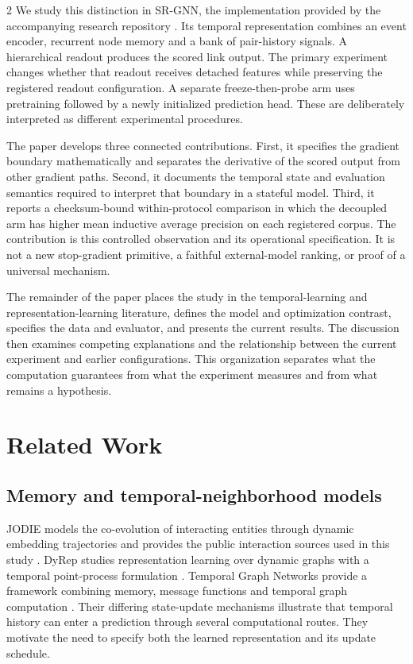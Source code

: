 \documentclass[a4paper,10pt]{article}
\begin{document}
\begin{multicols}{2}
We study this distinction in SR-GNN, the implementation provided by the accompanying research repository \cite{repo}. Its temporal representation combines an event encoder, recurrent node memory and a bank of pair-history signals. A hierarchical readout produces the scored link output. The primary experiment changes whether that readout receives detached features while preserving the registered readout configuration. A separate freeze-then-probe arm uses pretraining followed by a newly initialized prediction head. These are deliberately interpreted as different experimental procedures.

The paper develops three connected contributions. First, it specifies the gradient boundary mathematically and separates the derivative of the scored output from other gradient paths. Second, it documents the temporal state and evaluation semantics required to interpret that boundary in a stateful model. Third, it reports a checksum-bound within-protocol comparison in which the decoupled arm has higher mean inductive average precision on each registered corpus. The contribution is this controlled observation and its operational specification. It is not a new stop-gradient primitive, a faithful external-model ranking, or proof of a universal mechanism.

The remainder of the paper places the study in the temporal-learning and representation-learning literature, defines the model and optimization contrast, specifies the data and evaluator, and presents the current results. The discussion then examines competing explanations and the relationship between the current experiment and earlier configurations. This organization separates what the computation guarantees from what the experiment measures and from what remains a hypothesis.

\section{Related Work}
\subsection{Memory and temporal-neighborhood models}
JODIE models the co-evolution of interacting entities through dynamic embedding trajectories and provides the public interaction sources used in this study \cite{jodie}. DyRep studies representation learning over dynamic graphs with a temporal point-process formulation \cite{dyrep}. Temporal Graph Networks provide a framework combining memory, message functions and temporal graph computation \cite{tgn}. Their differing state-update mechanisms illustrate that temporal history can enter a prediction through several computational routes. They motivate the need to specify both the learned representation and its update schedule.


\end{multicols}
\end{document}
